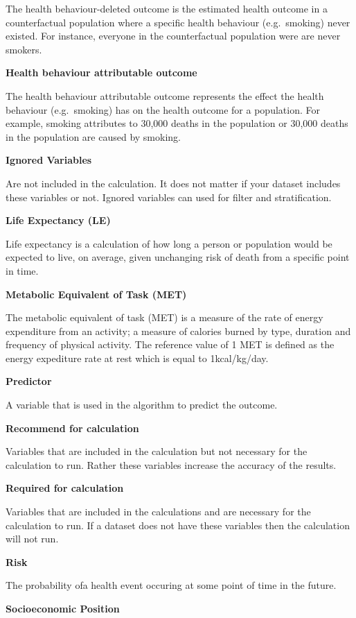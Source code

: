 \documentclass[]{book}
\begin{document}
The health behaviour-deleted outcome is the estimated health outcome in
a counterfactual population where a specific health behaviour
(e.g.~smoking) never existed. For instance, everyone in the
counterfactual population were are never smokers.

\textbf{Health behaviour attributable outcome}

The health behaviour attributable outcome represents the effect the
health behaviour (e.g.~smoking) has on the health outcome for a
population. For example, smoking attributes to 30,000 deaths in the
population or 30,000 deaths in the population are caused by smoking.

\textbf{Ignored Variables}

Are not included in the calculation. It does not matter if your dataset
includes these variables or not. Ignored variables can used for filter
and stratification.

\textbf{Life Expectancy (LE)}

Life expectancy is a calculation of how long a person or
population would be expected to live, on average, given unchanging risk
of death from a specific point in time.

\textbf{Metabolic Equivalent of Task (MET)}

The metabolic equivalent of task (MET) is a measure of the rate of
energy expenditure from an activity; a measure of calories burned by
type, duration and frequency of physical activity. The reference value
of 1 MET is defined as the energy expediture rate at rest which is equal
to 1kcal/kg/day.

\textbf{Predictor}

A variable that is used in the algorithm to predict the outcome.

\textbf{Recommend for calculation}

Variables that are included in the calculation but not necessary for the
calculation to run. Rather these variables increase the accuracy of the
results.

\textbf{Required for calculation}

Variables that are included in the calculations and are necessary for
the calculation to run. If a dataset does not have these variables then
the calculation will not run.

\textbf{Risk}

The probability ofa health event occuring at some point of time in the
future.

\textbf{Socioeconomic Position}
\end{document}
